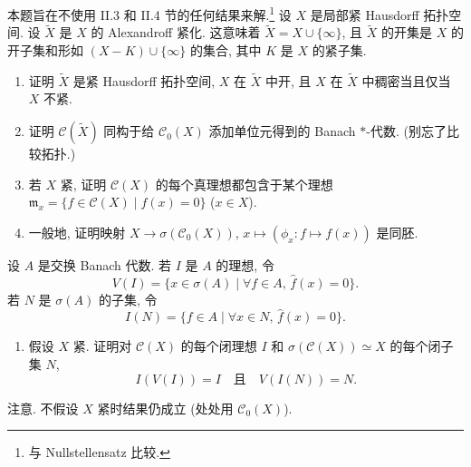 \begin{exercise}[$\mathcal{C}(X)$ 的谱]
\label{ex:II.5.3}
本题旨在不使用 II.3 和 II.4 节的任何结果来解.\footnote{与 Nullstellensatz 比较.}
设 $X$ 是局部紧 Hausdorff 拓扑空间. 设 $\tilde{X}$ 是 $X$ 的 Alexandroff 紧化. 这意味着 $\tilde{X} = X \cup \{\infty\}$, 且 $\tilde{X}$ 的开集是 $X$ 的开子集和形如 $(X - K) \cup \{\infty\}$ 的集合, 其中 $K$ 是 $X$ 的紧子集.
\begin{enumerate}
\item[(a)] 证明 $\tilde{X}$ 是紧 Hausdorff 拓扑空间, $X$ 在 $\tilde{X}$ 中开, 且 $X$ 在 $\tilde{X}$ 中稠密当且仅当 $X$ 不紧.
\item[(b)] 证明 $\mathcal{C}(\tilde{X})$ 同构于给 $\mathcal{C}_0(X)$ 添加单位元得到的 Banach $*$-代数. (别忘了比较拓扑.)
\item[(c)] 若 $X$ 紧, 证明 $\mathcal{C}(X)$ 的每个真理想都包含于某个理想 $\mathfrak{m}_x = \{f \in \mathcal{C}(X) \mid f(x) = 0\}$ ($x \in X$).
\item[(d)] 一般地, 证明映射 $X \to \sigma(\mathcal{C}_0(X))$, $x \longmapsto (\phi_x \colon f \longmapsto f(x))$ 是同胚.
\end{enumerate}
设 $A$ 是交换 Banach 代数. 若 $I$ 是 $A$ 的理想, 令
\[
V(I) = \{x \in \sigma(A) \mid \forall f \in A,\, \hat{f}(x) = 0\}.
\]
若 $N$ 是 $\sigma(A)$ 的子集, 令
\[
I(N) = \{f \in A \mid \forall x \in N,\, \hat{f}(x) = 0\}.
\]
\begin{enumerate}
\item[(a)] 假设 $X$ 紧. 证明对 $\mathcal{C}(X)$ 的每个闭理想 $I$ 和 $\sigma(\mathcal{C}(X)) \simeq X$ 的每个闭子集 $N$,
\[
I(V(I)) = I \quad \text{且} \quad V(I(N)) = N.
\]
\end{enumerate}
注意. 不假设 $X$ 紧时结果仍成立 (处处用 $\mathcal{C}_0(X)$).


\end{exercise}
